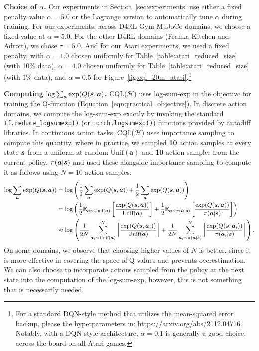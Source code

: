 \textbf{Choice of $\alpha$.} Our experiments in Section~\ref{sec:experiments} use either a fixed penalty value $\alpha = 5.0$ or the Lagrange version to automatically tune $\alpha$ during training. 
For our experiments, across D4RL Gym MuJoCo domains, we choose a fixed value at $\alpha = 5.0$. For the other D4RL domains (Franka Kitchen and Adroit), we chose $\tau = 5.0$. And for our Atari experiments, we used a fixed penalty, with $\alpha=1.0$ chosen uniformly for Table~\ref{table:atari_reduced_size} (with 10\% data), $\alpha=4.0$ chosen uniformly for Table~\ref{table:atari_reduced_size} (with 1\% data), and $\alpha=0.5$ for Figure~\ref{fig:cql_20m_atari}.\footnote{For a standard DQN-style method that utilizes the mean-squared error backup, please the hyperparameters in: \url{https://arxiv.org/abs/2112.04716}. Notably, with a DQN-style architecture, $\alpha=0.1$ is generally a good choice, across the board on all Atari games.}

\textbf{Computing $\log \sum_{\boldsymbol{a}} \exp(Q(\boldsymbol{s}, \boldsymbol{a})$.} CQL($\mathcal{H}$) uses log-sum-exp in the objective for training the Q-function (Equation~\ref{eqn:practical_objective}). In discrete action domains, we compute the log-sum-exp exactly by invoking the standard \texttt{tf.reduce\_logsumexp()} (or \texttt{torch.logsumexp()}) functions provided by autodiff libraries. In continuous action tasks, CQL($\mathcal{H}$) uses importance sampling to compute this quantity, where in practice, we sampled \textbf{10} action samples at every state $\boldsymbol{s}$ from a uniform-at-random $\text{Unif}(\mathbf{a})$ and \textbf{10} action samples from the current policy, $\pi(\boldsymbol{a}|\boldsymbol{s})$ and used these alongside importance sampling to compute it as follows using $N = 10$ action samples:
\begin{align*}
    \log \sum_{\boldsymbol{a}}\exp (Q(\boldsymbol{s}, \boldsymbol{a})) &= \log \left( \frac{1}{2}\sum_{\boldsymbol{a}} \exp (Q(\boldsymbol{s}, \boldsymbol{a})) + \frac{1}{2} \sum_{\boldsymbol{a}} \exp (Q(\boldsymbol{s}, \boldsymbol{a})) \right) \\
    &= \log \left( \frac{1}{2} \mathbb{E}_{\boldsymbol{a} \sim \text{Unif}(\boldsymbol{a})}\left[ \frac{\exp (Q(\boldsymbol{s}, \boldsymbol{a}))}{\text{Unif}(\boldsymbol{a})}\right] + \frac{1}{2} \mathbb{E}_{\boldsymbol{a} \sim \pi(\boldsymbol{a}|\boldsymbol{s})}\left[ \frac{\exp (Q(\boldsymbol{s}, \boldsymbol{a}))}{\pi(\boldsymbol{a}|\boldsymbol{s})}\right] \right) \\
    &\approx \log \left( \frac{1}{2N} \sum_{\boldsymbol{a}_i \sim \text{Unif}(\boldsymbol{a})}^N \left[ \frac{\exp (Q(\boldsymbol{s}, \boldsymbol{a}_i))}{\text{Unif}(\boldsymbol{a})}\right] + \frac{1}{2N} \sum_{\boldsymbol{a}_i \sim \pi(\boldsymbol{a}|\boldsymbol{s})}^N \left[ \frac{\exp (Q(\boldsymbol{s}, \boldsymbol{a}_i))}{\pi(\boldsymbol{a}_i|\boldsymbol{s})}\right] \right).
\end{align*}
On some domains, we observe that choosing higher values of $N$ is better, since it is more effective in covering the space of Q-values and prevents overestimation. We can also choose to incorporate actions sampled from the policy at the next state into the computation of the log-sum-exp, however, this is not something that is necessarily needed.

